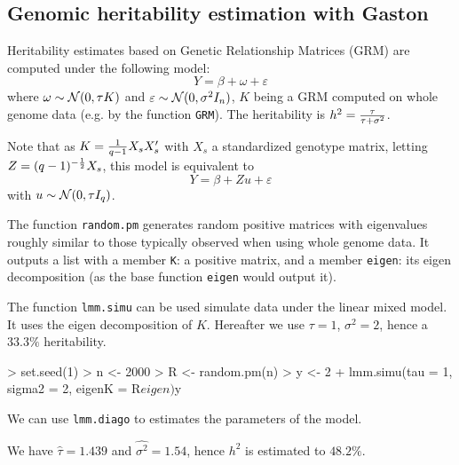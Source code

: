\documentclass{article}
\let\epsilon\varepsilon
\renewenvironment{Schunk}{\vspace{\topsep}}{\vspace{\topsep}}
\begin{document}
\subsection{Genomic heritability estimation with Gaston}

  Heritability estimates based on Genetic Relationship Matrices (GRM)
  are computed under the following model:
  \begin{equation*}
  Y = \beta + \omega + \epsilon
  \end{equation*}
  where $\omega \sim \mathcal{N}(0, \tau K)$ and $\epsilon\sim \N(0, \sigma^2 I_n)$,
  $K$ being a GRM computed on whole genome data (e.g. by the function \verb!GRM!).
  The heritability is $h^2 = {\tau \over \tau + \sigma^2}$.

  Note that as $K = {1\over q-1} X_sX_s'$ with $X_s$ a standardized genotype matrix, 
  letting $Z = (q-1)^{-{1 \over 2}} X_s$, this model is equivalent to 
  \begin{equation*}
  Y = \beta + Zu + \epsilon
  \end{equation*}
  with $u \sim \mathcal{N}(0,\tau I_q)$.

  The function \verb!random.pm! generates random positive matrices with eigenvalues
  roughly similar to those typically observed when using whole genome data. It outputs a list
  with a member \verb!K!: a positive matrix, and a member \verb!eigen!: its eigen 
  decomposition (as the base function \verb!eigen! would output it).

  The function \verb!lmm.simu! can be used simulate data under the linear mixed model.
  It uses the eigen decomposition of $K$. Hereafter we use $\tau = 1$, $\sigma^2 = 2$,
  hence a $33.3\%$ heritability.

\begin{Schunk}
\begin{Sinput}
> set.seed(1)
> n <- 2000
> R <- random.pm(n)
> y <- 2 + lmm.simu(tau = 1, sigma2 = 2, eigenK = R$eigen)$y
\end{Sinput}
\end{Schunk}

  We can use \verb!lmm.diago! to estimates the parameters of the model.

\begin{Schunk}
\end{Schunk}

  We have $\widehat\tau = 1.439$ and $ = 1.54$,
  hence $h^2$ is estimated to $48.2\%$.
\end{document}
